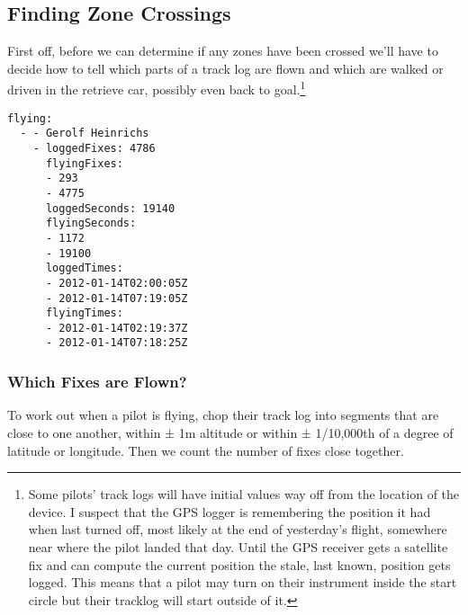 \documentclass[gap.tex]{subfiles}
\begin{document}
\subsection{Finding Zone Crossings}

First off, before we can determine if any zones have been crossed we'll have to
decide how to tell which parts of a track log are flown and which are walked or
driven in the retrieve car, possibly even back to goal.\footnote{Some pilots'
track logs will have initial values way off from the location of the device.
I suspect that the GPS logger is remembering the position it had when last
turned off, most likely at the end of yesterday's flight, somewhere near where
the pilot landed that day. Until the GPS receiver gets a satellite fix and can
compute the current position the stale, last known, position gets logged. This
means that a pilot may turn on their instrument inside the start circle but
their tracklog will start outside of it.}

\begin{lstlisting}[caption={Which fixes are considered flown, \texttt{flying} nodes of \texttt{*.cross-zone.yaml}.}]
flying:
  - - Gerolf Heinrichs
    - loggedFixes: 4786
      flyingFixes:
      - 293
      - 4775
      loggedSeconds: 19140
      flyingSeconds:
      - 1172
      - 19100
      loggedTimes:
      - 2012-01-14T02:00:05Z
      - 2012-01-14T07:19:05Z
      flyingTimes:
      - 2012-01-14T02:19:37Z
      - 2012-01-14T07:18:25Z
\end{lstlisting}

\subsubsection{Which Fixes are Flown?}
To work out when a pilot is flying, chop their track log into segments that are
close to one another, within ± 1m altitude or within ± 1/10,000th of a degree
of latitude or longitude. Then we count the number of fixes close together.
\end{document}
